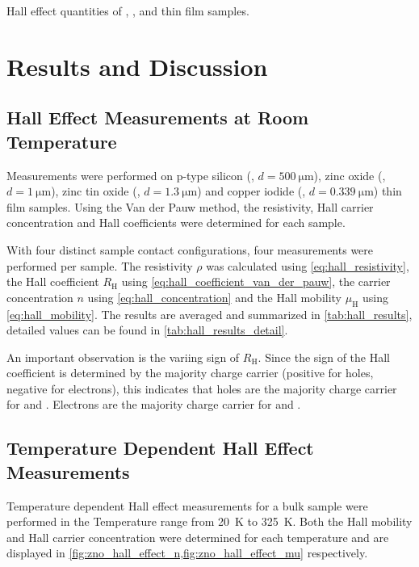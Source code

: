 \begin{table*}
	\centering	
		
	\caption{Hall effect quantities of , ,  and  
	thin film samples.}
	\label{tab:hall_results}
\end{table*}

\section{Results and Discussion}
\subsection{Hall Effect Measurements at Room Temperature}
Measurements were performed on p-type silicon (, $d=\qty{500}{\micro\meter}$), 
zinc oxide (, $d=\qty{1}{\micro\meter}$), zinc tin oxide (, 
$d=\qty{1.3}{\micro\meter}$) and copper iodide (, $d=\qty{0.339}{\micro\meter}$) 
thin film samples.
Using the Van der Pauw method, the resistivity, Hall carrier concentration and Hall 
coefficients were determined for each sample.

With four distinct sample contact configurations, four measurements were performed 
per sample. 
The resistivity $\rho$ was calculated using \cref{eq:hall_resistivity}, 
the Hall coefficient $R_{\mathrm{H}}$ using \cref{eq:hall_coefficient_van_der_pauw},
the carrier concentration $n$ using \cref{eq:hall_concentration} 
and the Hall mobility $\mu_{\mathrm{H}}$ using \cref{eq:hall_mobility}.
The results are averaged and summarized in \cref{tab:hall_results}, detailed values
can be found in \cref{tab:hall_results_detail}.

An important observation is the variing sign of $R_{\mathrm{H}}$. 
Since the sign of the Hall coefficient is determined by the majority charge carrier
(positive for holes, negative for electrons), this indicates that holes are the majority
charge carrier for  and . 
Electrons are the majority charge carrier for  and . 

\subsection{Temperature Dependent Hall Effect Measurements}
Temperature dependent Hall effect measurements for a bulk  sample 
were performed in the Temperature range from \qty{20}{\kelvin} to \qty{325}{\kelvin}.
Both the Hall mobility and Hall carrier concentration were determined for each 
temperature and are displayed in 
\cref{fig:zno_hall_effect_n,fig:zno_hall_effect_mu} respectively.


